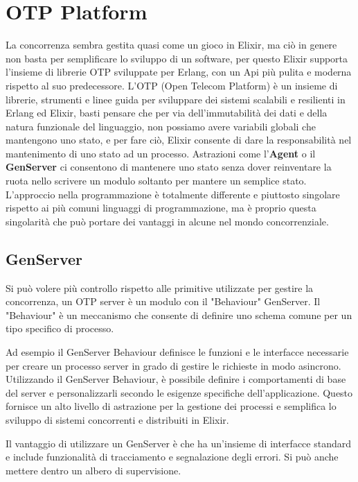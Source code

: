 	\section{OTP Platform}

La concorrenza sembra gestita quasi come un gioco in Elixir,
ma ciò in genere non basta per semplificare lo sviluppo
di un software, per questo Elixir supporta l'insieme di
librerie OTP sviluppate per Erlang, con un Api più pulita
e moderna rispetto al suo predecessore.
L'OTP (Open Telecom Platform) è un insieme di librerie,
strumenti e linee guida per sviluppare dei sistemi
scalabili e resilienti in Erlang ed
Elixir, basti pensare che per via dell'immutabilità
dei dati e della natura funzionale del linguaggio,
non possiamo avere variabili globali che mantengono
uno stato, e per fare ciò, Elixir consente di dare
la responsabilità nel mantenimento di uno stato
ad un processo. Astrazioni come l'\textbf{Agent} o il \textbf{GenServer}
ci consentono di mantenere uno stato senza dover reinventare la
ruota nello scrivere un modulo soltanto per mantere un semplice stato.
L'approccio nella programmazione è totalmente differente
e piuttosto singolare rispetto ai più comuni linguaggi di programmazione,
ma è proprio questa singolarità che può portare dei vantaggi in alcune
nel mondo concorrenziale. 


\subsection{GenServer}
Si può volere più controllo rispetto alle primitive utilizzate
per gestire la concorrenza, un OTP server è un modulo con il
"Behaviour" GenServer. 
Il "Behaviour" è un meccanismo che consente di definire
uno schema comune per un tipo specifico di processo.

Ad esempio il GenServer Behaviour definisce le funzioni e
le interfacce necessarie per creare un processo server in grado
di gestire le richieste in modo asincrono.
Utilizzando il GenServer Behaviour, è possibile definire i comportamenti
di base del server e personalizzarli secondo le esigenze specifiche
dell'applicazione. 
Questo fornisce un alto livello di astrazione per la gestione
dei processi e semplifica lo sviluppo di sistemi concorrenti e
distribuiti in Elixir.

Il vantaggio di utilizzare un GenServer è che ha un'insieme
di interfacce standard e include funzionalità di tracciamento
e segnalazione degli errori. Si può anche mettere dentro un
albero di supervisione.

